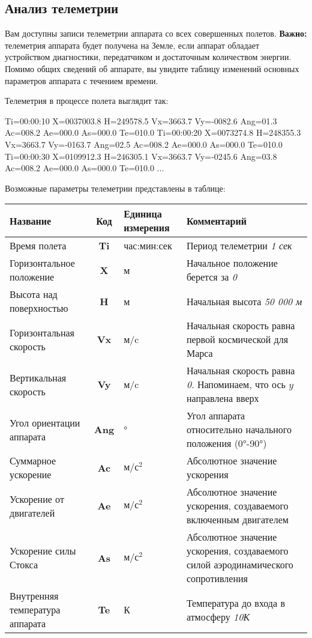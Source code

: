 \documentclass[12pt,a4paper]{article}
\begin{document}
\subsection{Анализ телеметрии}

Вам доступны записи телеметрии аппарата со всех совершенных полетов. \textbf{Важно:} телеметрия
аппарата будет получена на Земле, если аппарат обладает устройством диагностики,
передатчиком и достаточным количеством энергии. Помимо общих сведений об аппарате, вы
увидите таблицу изменений основных параметров аппарата с течением времени.

Телеметрия в процессе полета выглядит так:

\begin{verbatim*}
Ti=00:00:10 X=0037003.8 H=249578.5 Vx=3663.7 Vy=-0082.6 Ang=01.3
   Ac=008.2 Ae=000.0 As=000.0 Te=010.0
Ti=00:00:20 X=0073274.8 H=248355.3 Vx=3663.7 Vy=-0163.7 Ang=02.5
   Ac=008.2 Ae=000.0 As=000.0 Te=010.0
Ti=00:00:30 X=0109912.3 H=246305.1 Vx=3663.7 Vy=-0245.6 Ang=03.8
   Ac=008.2 Ae=000.0 As=000.0 Te=010.0
...
\end{verbatim*}

Возможные параметры телеметрии представлены в таблице:

\begin{center}
\begin{tabular}{ |p{5cm}|c|p{2.5cm}|p{6cm}| } 
  \hline
  \textbf{Название} & \textbf{Код} & \textbf{Единица измерения} & \textbf{Комментарий} \\
  \hline
  Время полета & \textbf{Ti} & час:мин:сек & Период телеметрии \emph{1 сек}\\
  \hline
  Горизонтальное положение & \textbf{X} & м & Начальное положение берется за \emph{0}\\
  \hline
  Высота над поверхностью & \textbf{H} & м & Начальная высота \emph{50 000 м}\\
  \hline
  Горизонтальная скорость & \textbf{Vx} & м/c & Начальная скорость равна первой
  космической для Марса\\
  \hline
  Вертикальная скорость & \textbf{Vy} & м/c & Начальная скорость равна
  \emph{0}. Напоминаем, что ось $y$ направлена вверх\\
  \hline
  Угол ориентации аппарата & \textbf{Ang} & ° & Угол аппарата относительно начального положения (0°-90°)\\
  \hline
  Суммарное ускорение & \textbf{Ac} & $\text{м}/\text{с}^{2}$ & Абсолютное значение ускорения\\
  \hline
  Ускорение от двигателей & \textbf{Ae} & $\text{м}/\text{с}^{2}$ & Абсолютное значение ускорения,
  создаваемого включенным двигателем\\
  \hline
  Ускорение силы Стокса & \textbf{As} & $\text{м}/\text{с}^{2}$ & Абсолютное значение ускорения,
  создаваемого силой аэродинамического сопротивления\\
  \hline
  Внутренняя температура аппарата & \textbf{Te} & К & Температура до входа в атмосферу \emph{10К}\\
  \hline
\end{tabular}
\end{center}
\end{document}

